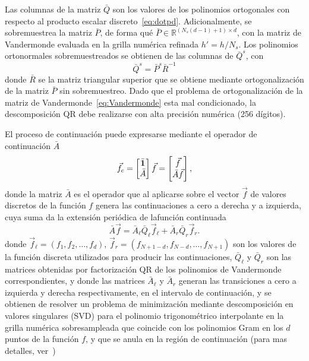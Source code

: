 Las columnas de la matriz $\bar{Q}$ son los valores de los polinomios ortogonales 
con respecto al producto escalar discreto~\eqref{eq:dotpd}.
Adicionalmente, se sobremuestrea la matriz $\bar{P}$, de forma qué 
$\bar{P} \in \mathbb{R}^{(N_s(d-1)+1)\times d}$, 
con la matriz de Vandermonde evaluada en la grilla numérica refinada $h'=h/N_s$. Los polinomios 
ortonormales sobremuestreados se obtienen de las columnas de $\bar{Q}^s$, con 
\begin{equation}
\bar{Q}^s=\bar{P}^s \bar{R}^{-1}
\label{eq:qsob}
\end{equation}
donde $\bar{R}$ se la matriz triangular superior que se obtiene 
mediante ortogonalización de la matriz $\bar{P}$ sin sobremuestreo. Dado 
que el problema de ortogonalización de la matriz de Vandermonde~\eqref{eq:Vandermonde} 
esta mal condicionado, la descomposición QR debe realizarse con alta precisión 
numérica (256 dígitos). 

El proceso de continuación puede expresarse mediante el operador de continuación $\bar{A}$
\begin{equation}
\vec{f}_c= 
\begin{bmatrix}
    \bar{\mathbf{1}} \\
    \bar{A}  \\
\end{bmatrix}
\vec{f}=
\begin{bmatrix}
    \vec{f}\\
    \bar{A} \vec{f}  \\
\end{bmatrix}
,
\label{eq:FCopA}
\end{equation}
donde la matriz $\bar{A}$ es el operador que al aplicarse sobre 
el vector $\vec{f}$ de valores discretos de la función $f$ 
genera las continuaciones a cero a derecha y a izquierda, cuya suma 
da la extensión periódica de lafunción continuada
\begin{equation}
    \bar{A}  \vec{f} = \bar{A}_{\ell} \bar{Q}_{\ell}  \vec{f}_{\ell} 
+\bar{A}_{r} \bar{Q}_{r}  \vec{f}_{r}.
\label{eq:Acont}
\end{equation}
donde $\vec{f}_{\ell}=(f_1,f_2,\ldots,f_d)$, 
 $\vec{f}_{r}=(f_{N+1-d},f_{N-d},\ldots,f_{N+1})$ 
 son los valores de la función discreta utilizados para producir las continuaciones, $\bar{Q}_{\ell} $ y $\bar{Q}_{r}$ son las matrices obtenidas por factorización 
QR de los polinomios de Vandermonde correspondientes, y donde las matrices $\bar{A}_{\ell}$ 
y $\bar{A}_{r}$ generan las transiciones a cero a izquierda y derecha respectivamente, en el intervalo de continuación, 
y se obtienen de resolver un problema de minimización mediante descomposición en valores singulares (SVD)
para el polinomio trigonométrico interpolante en la grilla numérica sobresampleada 
que coincide con los polinomios Gram en los $d$ puntos de la función $f$, y 
que se anula en la región de continuación (para mas detalles, ver~\cite{Amlani2016}) 

